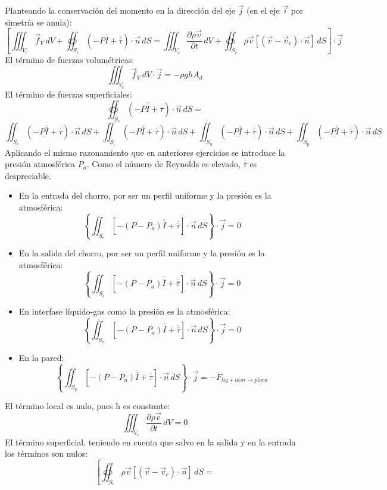 \begin{enumerate}
	Planteando la conservación del momento en la dirección del eje $\vec{j}$ (en el eje $\vec{i}$ por simetría se anula):
	\[\left[\iiint_{V_c}\vec{f}_V\,dV
	+
	\oiint_{S_c}\left(-P\overline{\overline{I}}+\overline{\overline{\tau}}\right)\cdot\vec{n}\,dS=
	\iiint_{V_c}\dfrac{\partial \rho\vec{v}}{\partial t}\,dV
	+ \oiint_{S_c}\rho\vec{v}\left[\left(\vec{v}-\vec{v}_c\right)\cdot\vec{n}\right]\,dS\right]\cdot \vec{j}\]
	El término de fuerzas volumétricas:
	\[\iiint_{V_c}\vec{f}_V\,dV \cdot \vec{j}=-\rho g h A_d\]
	El término de fuerzas superficiales:
	\[\oiint_{S_c}\left(-P\overline{\overline{I}}+\overline{\overline{\tau}}\right)\cdot\vec{n}\,dS=\]
	\[
	\iint_{S_e}\left(-P\overline{\overline{I}}+\overline{\overline{\tau}}\right)\cdot\vec{n}\,dS
	+
	\iint_{S_{i}}\left(-P\overline{\overline{I}}+\overline{\overline{\tau}}\right)\cdot\vec{n}\,dS
	+
	\iint_{S_n}\left(-P\overline{\overline{I}}+\overline{\overline{\tau}}\right)\cdot\vec{n}\,dS
	+
	\iint_{S_p}\left(-P\overline{\overline{I}}+\overline{\overline{\tau}}\right)\cdot\vec{n}\,dS
	\]
	Aplicando el mismo razonamiento que en anteriores ejercicios se introduce la presión atmosférica $P_a$. Como el número de Reynolds es elevado, $\overline{\overline{\tau}} $ es despreciable. 
	\begin{itemize}
		\item En la entrada del chorro, por ser un perfil uniforme y la presión es la atmosférica:
		\[\left\{\iint_{S_e}\left[-(P-P_a)\overline{\overline{I}}+\overline{\overline{\tau}}\right]\cdot\vec{n}\,dS\right\}\cdot \vec{j}=0\]
		\item En la salida del chorro, por ser un perfil uniforme y la presión es la atmosférica:
		\[\left\{\iint_{S_{i}}\left[-(P-P_a)\overline{\overline{I}}+\overline{\overline{\tau}}\right]\cdot\vec{n}\,dS\right\}\cdot \vec{j}=0\]
		\item En interfase líquido-gas como la presión es la atmosférica:
		\[\left\{\iint_{S_n}\left[-(P-P_a)\overline{\overline{I}}+\overline{\overline{\tau}}\right]\cdot\vec{n}\,dS\right\}\cdot \vec{j}=0\]
		\item En la pared:
		\[\left\{\iint_{S_p}\left[-(P-P_a)\overline{\overline{I}}+\overline{\overline{\tau}}\right]\cdot\vec{n}\,dS\right\}\cdot \vec{j}=-F_{liq+atm\rightarrow placa}\]
	\end{itemize}
	El término local es nulo, pues h es constante:
	\[\iiint_{V_c}\dfrac{\partial \rho\vec{v}}{\partial t}\,dV=0\]
	El término superficial, teniendo en cuenta que salvo en la salida y en la entrada los términos son nulos:
	\[\left[\oiint_{S_c}\rho\vec{v}\left[\left(\vec{v}-\vec{v}_c\right)\cdot\vec{n}\right]\,dS=
\]
\end{enumerate}
